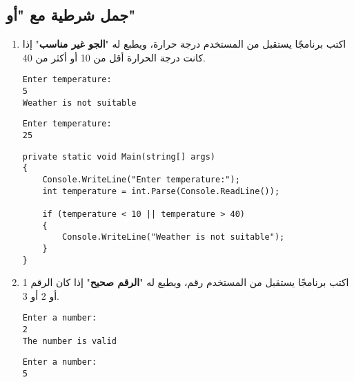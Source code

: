 \documentclass[12pt]{article}
\begin{document}
\begin{enumerate}[itemsep=3em]
\begin{enumerate}[itemsep=3em]
\begin{enumerate}[itemsep=3em]
\section{جمل شرطية مع "أو"}

\ifdetailed
\begin{enumerate}[itemsep=3em]
\else
\begin{enumerate}
\fi

\item
اكتب برنامجًا يستقبل من المستخدم درجة حرارة، ويطبع له "\textbf{الجو غير مناسب}" إذا كانت درجة الحرارة أقل من 10 أو أكثر من 40.
\ifdetailed
\begin{example}[1]
\begin{english}
\begin{lstlisting}
Enter temperature:
5
Weather is not suitable
\end{lstlisting}
\end{english}
\end{example}
\begin{example}[2]
\begin{english}
\begin{lstlisting}
Enter temperature:
25
\end{lstlisting}
\end{english}
\end{example}

\ifwithsols
\begin{solution}
\begin{english}
\begin{lstlisting}
private static void Main(string[] args)
{
    Console.WriteLine("Enter temperature:");
    int temperature = int.Parse(Console.ReadLine());

    if (temperature < 10 || temperature > 40)
    {
        Console.WriteLine("Weather is not suitable");
    }
}
\end{lstlisting}
\end{english}
\end{solution}
\clearpage
\fi
\fi

\item
اكتب برنامجًا يستقبل من المستخدم رقم، ويطبع له "\textbf{الرقم صحيح}" إذا كان الرقم 1 أو 2 أو 3.
\ifdetailed
\begin{example}[1]
\begin{english}
\begin{lstlisting}
Enter a number:
2
The number is valid
\end{lstlisting}
\end{english}
\end{example}
\begin{example}[2]
\begin{english}
\begin{lstlisting}
Enter a number:
5
\end{lstlisting}
\end{english}
\end{example}


\end{enumerate}
\end{enumerate}
\end{enumerate}
\end{enumerate}
\end{enumerate}
\end{document}
